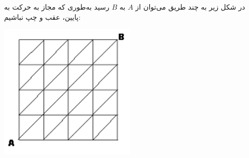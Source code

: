 \EXERCISE
در شکل زیر به چند طریق می‌توان از
$A$
به
$B$
رسید به‌طوری که مجاز به حرکت به پایین، عقب و چپ نباشیم:
\begin{center}
\includegraphics[height=6.5cm]{16.png}
\end{center}